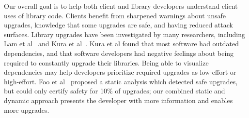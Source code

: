 Our overall goal is to help both client and library developers understand
client uses of library code. Clients benefit from sharpened warnings
about unsafe upgrades, knowledge that some upgrades are safe, and
having reduced attack surfaces. Library upgrades have been
investigated by many researchers, including Lam et
al~\cite{lam20:_puttin_seman_seman_version} and Kura et al~\cite{kula18:_do_devel_updat_their_librar_depen}. Kura et al found that most
software had outdated dependencies, and that software developers had
negative feelings about being required to constantly upgrade their
libraries. Being able to visualize dependencies may help developers
prioritize required upgrades as low-effort or high-effort.
Foo et al~\cite{foo18:_effic_static_check_librar_updat}
proposed a static analysis which detected safe upgrades, but could
only certify safety for 10\% of upgrades; our combined static and
dynamic approach presents the developer with more information and
enables more upgrades. 

